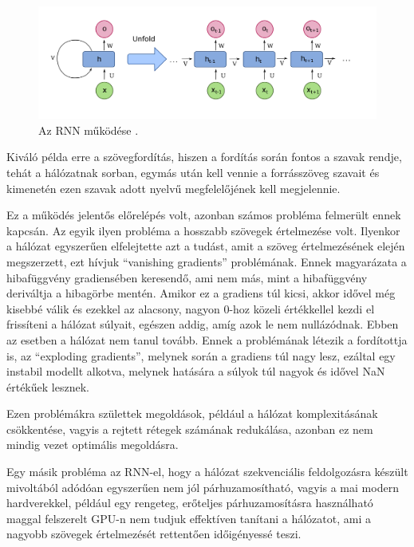 \begin{figure}[h]
\centering
\includegraphics[scale=0.2]{images/rnn.png}
\caption{Az RNN működése \cite{rnn}.}
\label{fig:rnn}
\end{figure}

Kiváló példa erre a szövegfordítás, hiszen a fordítás során fontos a szavak rendje, tehát a hálózatnak sorban, egymás után kell vennie a forrásszöveg szavait és kimenetén ezen szavak adott nyelvű megfelelőjének kell megjelennie.

Ez a működés jelentős előrelépés volt, azonban számos probléma felmerült ennek kapcsán. Az egyik ilyen probléma a hosszabb szövegek értelmezése volt. Ilyenkor a hálózat egyszerűen elfelejtette azt a tudást, amit a szöveg értelmezésének elején megszerzett, ezt hívjuk “vanishing gradients” problémának. Ennek magyarázata a hibafüggvény gradiensében keresendő, ami nem más, mint a hibafüggvény deriváltja a hibagörbe mentén. Amikor ez a gradiens túl kicsi, akkor idővel még kisebbé válik és ezekkel az alacsony, nagyon 0-hoz közeli értékkellel kezdi el frissíteni a hálózat súlyait, egészen addig, amíg azok le nem nullázódnak. Ebben az esetben a hálózat nem tanul tovább. Ennek a problémának létezik a fordítottja is, az “exploding gradients”, melynek során a gradiens túl nagy lesz, ezáltal egy instabil modellt alkotva, melynek hatására a súlyok túl nagyok és idővel NaN értékűek lesznek.

Ezen problémákra születtek megoldások, például a hálózat komplexitásának csökkentése, vagyis a rejtett rétegek számának redukálása, azonban ez nem mindig vezet optimális megoldásra.

Egy másik probléma az RNN-el, hogy a hálózat szekvenciális feldolgozásra készült mivoltából adódóan egyszerűen nem jól párhuzamosítható, vagyis a mai modern hardverekkel, például egy rengeteg, erőteljes párhuzamosításra használható maggal felszerelt GPU-n nem tudjuk effektíven tanítani a hálózatot, ami a nagyobb szövegek értelmezését rettentően időigényessé teszi.


